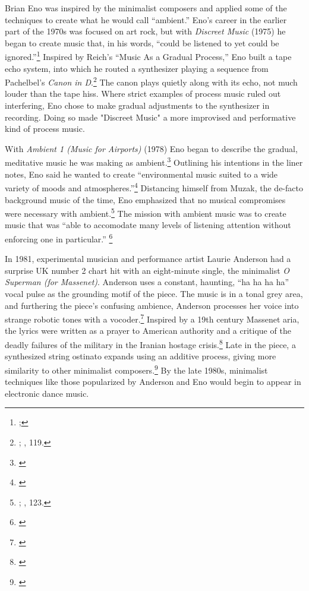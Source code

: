 \documentclass[12pt,twoside]{reedthesis}
\begin{document}
Brian Eno was inspired by the minimalist composers and applied some of the techniques to create what he would call ``ambient.'' Eno's career in the earlier part of the 1970s was focused on art rock, but with \emph{Discreet Music} (1975) he began to create music that, in his words, ``could be listened to yet could be ignored.''\footnote{\cite{brianenoDiscreetMusic1975};\cite{enoDiscreetMusicLiner}} Inspired by Reich's ``Music As a Gradual Process,'' Eno built a tape echo system, into which he routed a synthesizer playing a sequence from Pachelbel's \emph{Canon in D}.\footnote{\cite{enoDiscreetMusicLiner}; \cite{prendergastAmbientCenturyMahler2000}, 119.} The canon plays quietly along with its echo, not much louder than the tape hiss. Where strict examples of process music ruled out interfering, Eno chose to make gradual adjustments to the synthesizer in recording. Doing so made "Discreet Music" a more improvised and performative kind of process music.

With \emph{Ambient 1 (Music for Airports)} (1978) Eno began to describe the gradual, meditative music he was making as ambient.\footnote{\cite{enoAmbientMusicAirports1978}} Outlining his intentions in the liner notes, Eno said he wanted to create ``environmental music suited to a wide variety of moods and atmospheres.''\footnote{\cite{enoMusicAirportsLiner}} Distancing himself from Muzak, the de-facto background music of the time, Eno emphasized that no musical compromises were necessary with ambient.\footnote{\cite{enoMusicAirportsLiner}; \cite{prendergastAmbientCenturyMahler2000}, 123.} The mission with ambient music was to create music that was ``able to accomodate many levels of listening attention without enforcing one in particular.'' \footnote{\cite{enoMusicAirportsLiner}}

In 1981, experimental musician and performance artist Laurie Anderson had a surprise UK number 2 chart hit with an eight-minute single, the minimalist \emph{O Superman (for Massenet)}. Anderson uses a constant, haunting, ``ha ha ha ha'' vocal pulse as the grounding motif of the piece. The music is in a tonal grey area, and furthering the piece's confusing ambience, Anderson processes her voice into strange robotic tones with a vocoder.\footnote{\cite{eckenrothOnceAgainMusic2014}} Inspired by a 19th century Massenet aria, the lyrics were written as a prayer to American authority and a critique of the deadly failures of the military in the Iranian hostage crisis.\footnote{\cite{davesimpsonHowWeMade2016}} Late in the piece, a synthesized string ostinato expands using an additive process, giving more similarity to other minimalist composers.\footnote{\cite{eckenrothOnceAgainMusic2014}}  By the late 1980s, minimalist techniques like those popularized by Anderson and Eno would begin to appear in electronic dance music.
\end{document}
